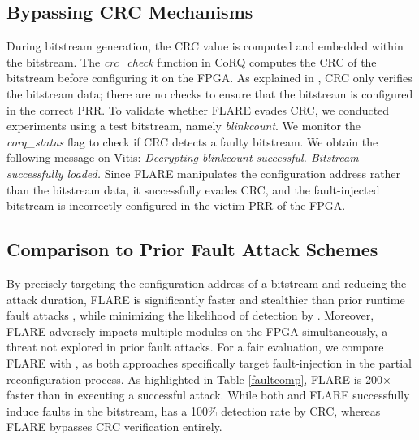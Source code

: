 \subsection{Bypassing CRC Mechanisms}
\vspace{-0.1cm}
During bitstream generation, the CRC value is computed and embedded within the bitstream. The \textit{crc\_check} function in CoRQ computes the CRC of the bitstream before configuring it on the FPGA. As explained in \cite{crc}, CRC only verifies the bitstream data; there are no checks to ensure that the bitstream is configured in the correct PRR. 
  To validate whether FLARE evades CRC, we conducted experiments using a test bitstream, namely \textit{blinkcount}. We monitor the \textit{corq\_status} flag to check if CRC detects a faulty bitstream. We obtain the following message on Vitis: \textit{Decrypting blinkcount successful. Bitstream successfully loaded.} Since FLARE manipulates the configuration address rather than the bitstream data, it successfully evades CRC, and the fault-injected bitstream is incorrectly configured in the victim PRR of the FPGA.
\vspace{-0.1cm}

\subsection{Comparison to Prior Fault Attack Schemes}
\vspace{-0.1cm}

By precisely targeting the configuration address of a bitstream and reducing the attack duration, FLARE is significantly faster and stealthier than prior runtime fault attacks \cite{8056840} \cite{FPGAhammer} \cite{7809042} \cite{8844478}, while minimizing the likelihood of detection by \cite{9643485} \cite{10.1145/3451236}. Moreover, FLARE adversely impacts multiple modules on the FPGA simultaneously, a threat not explored in prior fault attacks. For a fair evaluation, we compare FLARE with  \cite{chaudhuri2024hackingfabrictargetingpartial}, as both approaches specifically target fault-injection in the partial reconfiguration process. As highlighted in Table \ref{faultcomp}, FLARE is 200$\times$ faster than \cite{chaudhuri2024hackingfabrictargetingpartial} in executing a successful attack. While both \cite{chaudhuri2024hackingfabrictargetingpartial} and FLARE successfully induce faults in the bitstream, \cite{chaudhuri2024hackingfabrictargetingpartial} has a 100\% detection rate by CRC, whereas FLARE bypasses CRC verification entirely.  

